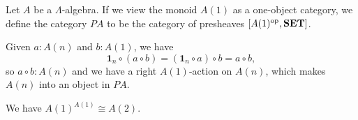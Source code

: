 \begin{definition}
  Let $ A $ be a $ \Lambda $-algebra. If we view the monoid $ A(1) $ as a one-object category, we define the category $ PA $ to be the category of presheaves $ [A(1)^{\text{op}}, \mathbf{SET}] $.
\end{definition}

\begin{definition}
  Given $ a: A(n) $ and $ b: A(1) $, we have
  \[ \mathbf 1_n \circ (a \circ b) = (\mathbf 1_n \circ a) \circ b = a \circ b, \]
  so $ a \circ b: A(n) $ and we have a right $ A(1) $-action on $ A(n) $, which makes $ A(n) $ into an object in $ PA $.
\end{definition}

\begin{lemma}
  We have $ A(1)^{A(1)} \cong A(2) $.
\end{lemma}
